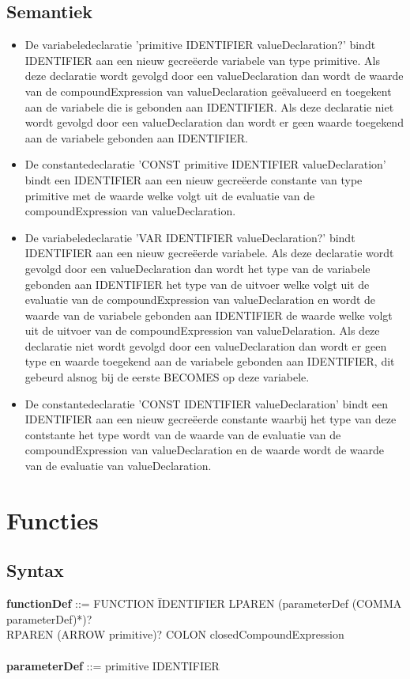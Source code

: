     \subsection{Semantiek}
        \begin{itemize}
        \item De variabeledeclaratie 'primitive IDENTIFIER valueDeclaration?' bindt IDENTIFIER aan een nieuw gecre\"{e}erde variabele van type primitive. Als deze declaratie wordt gevolgd door een valueDeclaration dan wordt de waarde van de compoundExpression van valueDeclaration ge\"{e}valueerd en toegekent aan de variabele die is gebonden aan IDENTIFIER. Als deze declaratie niet wordt gevolgd door een valueDeclaration dan wordt er geen waarde toegekend aan de variabele gebonden aan IDENTIFIER.
        \item De constantedeclaratie 'CONST primitive IDENTIFIER valueDeclaration' bindt een IDENTIFIER aan een nieuw gecre\"{e}erde constante van type primitive met de waarde welke volgt uit de evaluatie van de compoundExpression van valueDeclaration.
        \item De variabeledeclaratie 'VAR IDENTIFIER valueDeclaration?' bindt IDENTIFIER aan een nieuw gecre\"{e}erde variabele. Als deze declaratie wordt gevolgd door een valueDeclaration dan wordt het type van de variabele gebonden aan IDENTIFIER het type van de uitvoer welke volgt uit de evaluatie van de compoundExpression van valueDeclaration en wordt de waarde van de variabele gebonden aan IDENTIFIER de waarde welke volgt uit de uitvoer van de compoundExpression van valueDelaration. Als deze declaratie niet wordt gevolgd door een valueDeclaration dan wordt er geen type en waarde toegekend aan de variabele gebonden aan IDENTIFIER, dit gebeurd alsnog bij de eerste BECOMES op deze variabele.
        \item De constantedeclaratie 'CONST IDENTIFIER valueDeclaration' bindt een IDENTIFIER aan een nieuw gecre\"{e}erde constante waarbij het type van deze contstante het type wordt van de waarde van de evaluatie van de compoundExpression van valueDeclaration en de waarde wordt de waarde van de evaluatie van valueDeclaration. 
        \end{itemize}

\section{Functies}
    \subsection{Syntax}
        \begin{tabbing}
            {\bf functionDef}                 ::= FUNCTION \=IDENTIFIER LPAREN (parameterDef (COMMA parameterDef)*)?\\
                                                  \>RPAREN (ARROW primitive)? COLON closedCompoundExpression\\
            \\
            {\bf parameterDef}                ::= primitive IDENTIFIER \\
            \\
        \end{tabbing}
